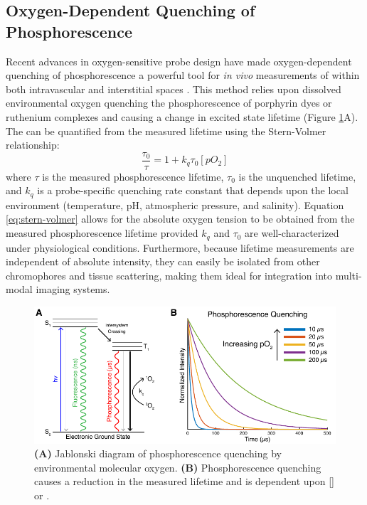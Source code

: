 \subsection{Oxygen-Dependent Quenching of Phosphorescence}
Recent advances in oxygen-sensitive probe design have made oxygen-dependent quenching of phosphorescence a powerful tool for \textit{in vivo} measurements of  within both intravascular and interstitial spaces \cite{Vinogradov:2012tda, Esipova:2011hi}. This method relies upon dissolved environmental oxygen quenching the phosphorescence of porphyrin dyes or ruthenium complexes and causing a change in excited state lifetime (Figure \ref{fig:jablonski}A).  The  can be quantified from the measured lifetime using the Stern-Volmer relationship:
%
\begin{equation}
    \label{eq:stern-volmer}
    \frac{\tau_{0}}{\tau} = 1 + k_{q}\tau_{0}[pO_{2}]
\end{equation}
%
where $\tau$ is the measured phosphorescence lifetime, $\tau_{0}$ is the unquenched lifetime, and $k_{q}$ is a probe-specific quenching rate constant that depends upon the local environment (temperature, pH, atmospheric pressure, and salinity). Equation \ref{eq:stern-volmer} allows for the absolute oxygen tension to be obtained from the measured phosphorescence lifetime provided $k_q$ and $\tau_{0}$ are well-characterized under physiological conditions. Furthermore, because lifetime measurements are independent of absolute intensity, they can easily be isolated from other chromophores and tissue scattering, making them ideal for integration into multi-modal imaging systems.

\begin{figure}
    \includegraphics{figures/chapter_1/jablonski.pdf}
    \caption {
        \label{fig:jablonski}
        \textbf{(A)} Jablonski diagram of phosphorescence quenching by environmental molecular oxygen. \textbf{(B)} Phosphorescence quenching causes a reduction in the measured lifetime and is dependent upon [] or .
    }
\end{figure}

